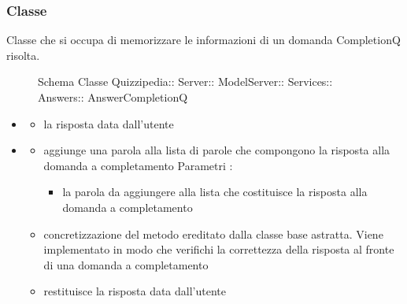 \subsubsection{Classe }
Classe che si occupa di memorizzare le informazioni di un domanda CompletionQ risolta.
\begin{figure}[H]
\centering
\noindent{}
\caption[Schema Classe AnswerCompletionQ]{Schema Classe Quizzipedia:: Server:: ModelServer:: Services:: Answers:: AnswerCompletionQ}
\end{figure}
\begin{itemize}
\item {}
\begin{itemize}
\item {}
\newline
la risposta data dall'utente
\end{itemize}
\item {}
\begin{itemize}
\item {}
\newline
aggiunge una parola alla lista di parole che compongono la risposta alla domanda a completamento
\newline
Parametri :
\begin{itemize}
\item {}
\newline
la parola da aggiungere alla lista che costituisce la risposta alla domanda a completamento
\end{itemize}
\item {}
\newline
concretizzazione del metodo ereditato dalla classe base astratta. Viene implementato in modo che verifichi la correttezza della risposta al fronte di una domanda a completamento
\newline
\item {}
\newline
restituisce la risposta data dall'utente
\newline
\end{itemize}
\end{itemize}
